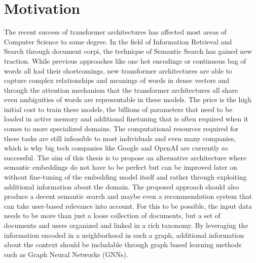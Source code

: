 \documentclass[draft,final]{vutinfth} %
\begin{document}
\section{Motivation}
The recent success of transformer architectures has affected most areas of Computer Science to some degree. In the field of Information Retrieval and Search through document corpi, the technique of Semantic Search has gained new traction. While previous approaches like one hot encodings or continuous bag of words all had their shortcomings, new transformer architectures are able to capture complex relationships and meanings of words in dense vectors and through the attention mechanism that the transformer architectures all share even ambiguities of words are representable in these models.
The price is the high initial cost to train these models, the billions of parameters that need to be loaded in active memory and additional finetuning that is often required when it comes to more specialized domains.
The computational resources required for these tasks are still infeasible to most individuals and even many companies, which is why big tech companies like Google and OpenAI are currently so successful. The aim of this thesis is to propose an alternative architecture where semantic embeddings do not have to be perfect but can be improved later on without fine-tuning of the embedding model itself and rather through exploiting additional information about the domain. The proposed approach should also produce a decent semantic search and maybe even a recommendation system that can take user-based relevance into account. For this to be possible, the input data needs to be more than just a loose collection of documents, but a set of documents and users organized and linked in a rich taxonomy. By leveraging the information encoded in a neighborhood in such a graph, additional information about the context should be includable through graph based learning methods such as Graph Neural Networks (GNNs).
\end{document}
